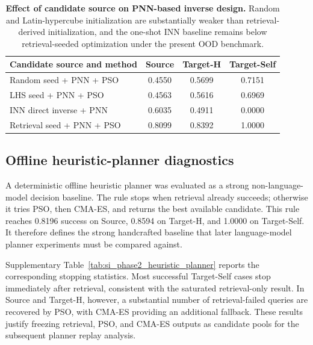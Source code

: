 \documentclass[final,1p,times]{elsarticle}
\begin{document}
\begin{table}[htbp!]
\centering
\caption{\textbf{Effect of candidate source on PNN-based inverse design.}
Random and Latin-hypercube initialization are substantially weaker than retrieval-derived initialization, and the one-shot INN baseline remains below retrieval-seeded optimization under the present OOD benchmark.}
\label{tab:si_phase2_seed_source}
\footnotesize
\setlength{\tabcolsep}{4.8pt}
\renewcommand{\arraystretch}{1.12}
\begin{tabular}{lccc}
\toprule
Candidate source and method & Source & Target-H & Target-Self \\
\midrule
Random seed + PNN + PSO & 0.4550 & 0.5699 & 0.7151 \\
LHS seed + PNN + PSO & 0.4563 & 0.5616 & 0.6969 \\
INN direct inverse + PNN & 0.6035 & 0.4911 & 0.0000 \\
Retrieval seed + PNN + PSO & 0.8099 & 0.8392 & 1.0000 \\
\bottomrule
\end{tabular}
\end{table}

\subsection{Offline heuristic-planner diagnostics}

A deterministic offline heuristic planner was evaluated as a strong non-language-model decision baseline. The rule stops when retrieval already succeeds; otherwise it tries PSO, then CMA-ES, and returns the best available candidate. This rule reaches 0.8196 success on Source, 0.8594 on Target-H, and 1.0000 on Target-Self. It therefore defines the strong handcrafted baseline that later language-model planner experiments must be compared against.

Supplementary Table~\ref{tab:si_phase2_heuristic_planner} reports the corresponding stopping statistics. Most successful Target-Self cases stop immediately after retrieval, consistent with the saturated retrieval-only result. In Source and Target-H, however, a substantial number of retrieval-failed queries are recovered by PSO, with CMA-ES providing an additional fallback. These results justify freezing retrieval, PSO, and CMA-ES outputs as candidate pools for the subsequent planner replay analysis.
\end{document}
